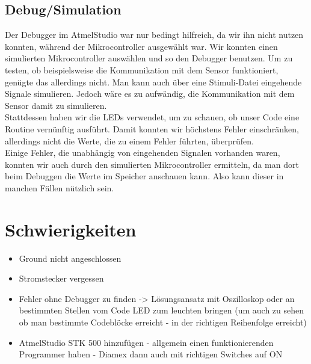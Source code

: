 \documentclass[]{article}
\begin{document}
\subsection{Debug/Simulation}
Der Debugger im AtmelStudio war nur bedingt hilfreich, da wir ihn nicht nutzen konnten, während der Mikrocontroller ausgewählt war. Wir konnten einen simulierten Mikrocontroller auswählen und so den Debugger benutzen. Um zu testen, ob beispielsweise die Kommunikation mit dem Sensor funktioniert, genügte das allerdings nicht. Man kann auch über eine Stimuli-Datei eingehende Signale simulieren. Jedoch wäre es zu aufwändig, die Kommunikation mit dem Sensor damit zu simulieren. \\Stattdessen haben wir die LEDs verwendet, um zu schauen, ob unser Code eine Routine vernünftig ausführt. Damit konnten wir höchstens Fehler einschränken, allerdings nicht die Werte, die zu einem Fehler führten, überprüfen. \\Einige Fehler, die unabhängig von eingehenden Signalen vorhanden waren, konnten wir auch durch den simulierten Mikrocontroller ermitteln, da man dort beim Debuggen die Werte im Speicher anschauen kann. Also kann dieser in manchen Fällen nützlich sein.

\section{Schwierigkeiten}
\begin{itemize}
	\item Ground nicht angeschlossen
	\item Stromstecker vergessen
	\item Fehler ohne Debugger zu finden -> Lösungsansatz mit Oszilloskop oder an bestimmten Stellen vom Code LED zum leuchten bringen (um auch zu sehen ob man bestimmte Codeblöcke erreicht - in der richtigen Reihenfolge erreicht)
	\item AtmelStudio STK 500 hinzufügen - allgemein einen funktionierenden Programmer haben - Diamex dann auch mit richtigen Switches auf ON 
\end{itemize}
\end{document}

